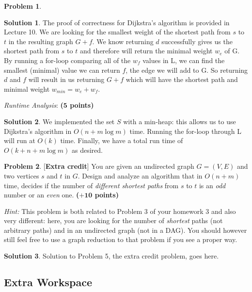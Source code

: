 \documentclass{article}
\theoremstyle{definition}
\newtheorem{problem}{Problem}
\newtheorem*{solution*}{Solution}
\newenvironment{solution}{\begin{solution*}}{{} \end{solution*}}
\newcommand{\grade}[1]{\hfill{\textbf{($\mathbf{#1}$ points)}}}
\begin{document}
\begin{problem}
\begin{enumerate}
\begin{solution}
	\item The proof of correctness for Dijkstra's algorithm is provided in Lecture 10. We are looking for the smallest weight of the shortest path from $s$ to $t$ in the resulting graph $G + f$. We know returning $d$ successfully gives us the shortest path from $s$ to $t$ and therefore will return the minimal weight $w_e$ of G. By running a for-loop comparing all of the $w_f$ values in L, we can find the smallest (minimal) value we can return $f$, the edge we will add to G. So returning $d$ and $f$ will result in us returning $G + f$ which will have the shortest path and minimal weight $w_{min} = w_e + w_f$. 
\end{solution}


\bigskip


	\item[(c)] \emph{Runtime Analysis}: \grade{5} 
	
	
\begin{solution}
	\item We implemented the set $S$ with a min-heap: this allows us to use Dijkstra’s algorithm in $O(n + m\log m)$ time. Running the for-loop through L will run at $O(k)$ time. Finally, we have a total run time of $O(k + n + m\log m)$ as desired.
\end{solution}

\end{enumerate}

\end{problem}

\newpage

\newpage

\begin{problem}\label{extra}[\textbf{Extra credit}]
	You are given an undirected graph $G=(V,E)$ and two vertices $s$ and $t$ in $G$. Design and analyze an algorithm that in $O(n+m)$ time, decides if the number of \emph{different shortest paths} from $s$ to $t$ is an \emph{odd} number or an \emph{even} one. 
	\grade{+10}
	
	\emph{Hint:} This problem is both related to Problem 3 of your homework 3 and also very different: here, you are looking for the number of \emph{shortest} paths (not arbitrary paths) and in an undirected graph (not in a DAG). You should however still feel free to use a graph reduction to that problem 
	if you see a proper way. 
	
\end{problem}


\begin{solution}
	Solution to Problem 5, the extra credit problem, goes here. 
\end{solution}

\newpage
\subsection*{Extra Workspace}
\end{document}
